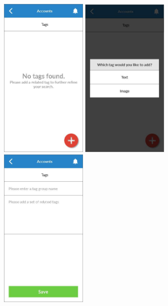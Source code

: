 \begin{figure}
  \subfigures
  \centering
  \begin{minipage}{4.6cm}
    \centering
    \includegraphics[width=4.2cm]{inc/ui_tag_step1.jpg}
    \caption{}
    \label{fig:ui_tag_step1}
  \end{minipage}
  \begin{minipage}{4.6cm}
    \centering
    \includegraphics[width=4.2cm]{inc/ui_tag_step2.jpg}
    \caption{}
    \label{fig:ui_tag_step2}
  \end{minipage}
  \begin{minipage}{4.6cm}
    \centering
    \includegraphics[width=4.2cm]{inc/ui_tag_step3.jpg}
    \caption{}
    \label{fig:ui_tag_step3}
  \end{minipage}
\end{figure}

